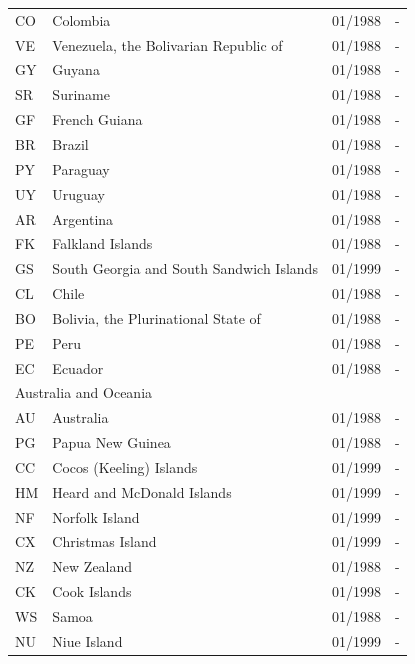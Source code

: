 \begin{footnotesize}
\begin{longtable}{lp{8cm}p{2cm}p{2cm}}
	CO & Colombia                                 & 01/1988 & -  \\
	VE & Venezuela, the Bolivarian Republic of    & 01/1988 & -  \\
	GY & Guyana                                   & 01/1988 & -  \\
	SR & Suriname                                 & 01/1988 & -  \\
	GF & French Guiana                            & 01/1988 & -  \\
	BR & Brazil                                   & 01/1988 & -  \\
	PY & Paraguay                                 & 01/1988 & -  \\
	UY & Uruguay                                  & 01/1988 & -  \\
	AR & Argentina                                & 01/1988 & -  \\
	FK & Falkland Islands                         & 01/1988 & -  \\
	GS & South Georgia and South Sandwich Islands & 01/1999 & -  \\
	CL & Chile                                    & 01/1988 & -  \\
	BO & Bolivia, the Plurinational State of      & 01/1988 & -  \\
	PE & Peru                                     & 01/1988 & -  \\
	EC & Ecuador                                  & 01/1988 & -  \\
	\midrule
	\multicolumn{3}{l}{Australia and Oceania}  &  \\
	AU & Australia                       & 01/1988 & -  \\
	PG & Papua New Guinea                & 01/1988 & -  \\
	CC & Cocos (Keeling) Islands         & 01/1999 & -  \\
	HM & Heard and McDonald Islands      & 01/1999 & -  \\
	NF & Norfolk Island                  & 01/1999 & -  \\
	CX & Christmas Island                & 01/1999 & -  \\
	NZ & New Zealand                     & 01/1988 & -  \\
	CK & Cook Islands                    & 01/1998 & -  \\
	WS & Samoa                           & 01/1988 & -  \\
	NU & Niue Island                     & 01/1999 & -  \\

\end{longtable}
\end{footnotesize}

